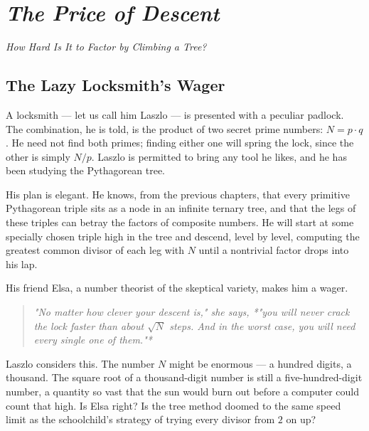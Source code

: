 \chapter{\textit{The Price of Descent}}
\begin{center}\large\itshape \textit{How Hard Is It to Factor by Climbing a Tree?}\end{center}
\medskip
\label{ch08}




\bigskip


\section{The Lazy Locksmith's Wager}

A locksmith --- let us call him Laszlo --- is presented with a peculiar padlock. The combination, he is told, is the product of two secret prime numbers: $N = p \cdot q$. He need not find both primes; finding either one will spring the lock, since the other is simply $N / p$. Laszlo is permitted to bring any tool he likes, and he has been studying the Pythagorean tree.

His plan is elegant. He knows, from the previous chapters, that every primitive Pythagorean triple sits as a node in an infinite ternary tree, and that the legs of these triples can betray the factors of composite numbers. He will start at some specially chosen triple high in the tree and descend, level by level, computing the greatest common divisor of each leg with $N$ until a nontrivial factor drops into his lap.

His friend Elsa, a number theorist of the skeptical variety, makes him a wager.

\begin{quote}
\itshape \textit{"No matter how clever your descent is,"} she says, *"you will never crack the lock faster than about $\sqrt{N}$ steps. And in the worst case, you will need every single one of them."*
\end{quote}

Laszlo considers this. The number $N$ might be enormous --- a hundred digits, a thousand. The square root of a thousand-digit number is still a five-hundred-digit number, a quantity so vast that the sun would burn out before a computer could count that high. Is Elsa right? Is the tree method doomed to the same speed limit as the schoolchild's strategy of trying every divisor from $2$ on up?

